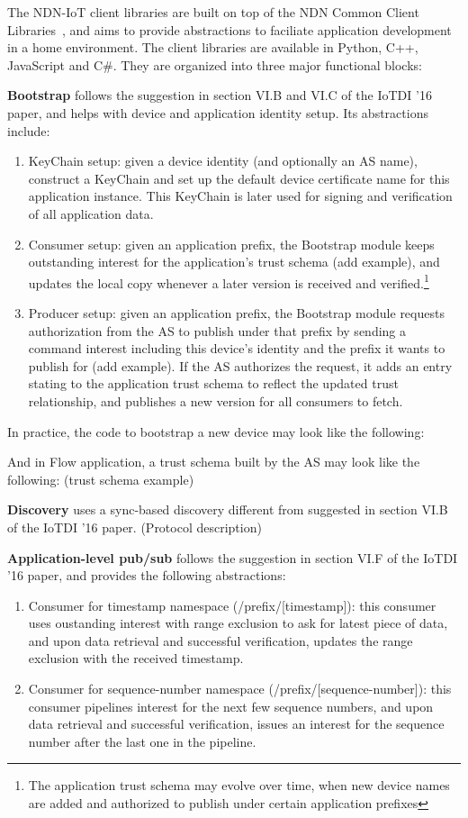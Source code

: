 The NDN-IoT client libraries are built on top of the NDN Common Client Libraries~\cite{ccl}, and aims to provide abstractions to faciliate application development in a home environment. 
The client libraries are available in Python, C++, JavaScript and C\#. 
They are organized into three major functional blocks:

\textbf{Bootstrap} follows the suggestion in section VI.B and VI.C of the IoTDI '16 paper, and helps with device and application identity setup. Its abstractions include: 
\begin{enumerate}
\item KeyChain setup: given a device identity (and optionally an AS name), construct a KeyChain and set up the default device certificate name for this application instance. This KeyChain is later used for signing and verification of all application data.
\item Consumer setup: given an application prefix, the Bootstrap module keeps outstanding interest for the application's trust schema (add example), and updates the local copy whenever a later version is received and verified.\footnote{The application trust schema may evolve over time, when new device names are added and authorized to publish under certain application prefixes}
\item Producer setup: given an application prefix, the Bootstrap module requests authorization from the AS to publish under that prefix by sending a command interest including this device's identity and the prefix it wants to publish for (add example). If the AS authorizes the request, it adds an entry stating to the application trust schema to reflect the updated trust relationship, and publishes a new version for all consumers to fetch.
\end{enumerate}

In practice, the code to bootstrap a new device may look like the following:

And in Flow application, a trust schema built by the AS may look like the following:
(trust schema example)

\textbf{Discovery} uses a sync-based discovery different from suggested in section VI.B of the IoTDI '16 paper. 
(Protocol description)

\textbf{Application-level pub/sub} follows the suggestion in section VI.F of the IoTDI '16 paper, and provides the following abstractions:
\begin{enumerate}
\item Consumer for timestamp namespace (/prefix/[timestamp]): this consumer uses oustanding interest with range exclusion to ask for latest piece of data, and upon data retrieval and successful verification, updates the range exclusion with the received timestamp.
\item Consumer for sequence-number namespace (/prefix/[sequence-number]): this consumer pipelines interest for the next few sequence numbers, and upon data retrieval and successful verification, issues an interest for the sequence number after the last one in the pipeline.
\end{enumerate}


